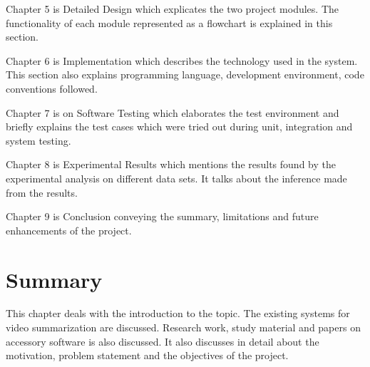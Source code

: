 Chapter 5 is Detailed Design which explicates the two project modules. The functionality of each module represented as a flowchart is explained in this section.

Chapter 6 is Implementation which describes the technology used in the system. This section also explains programming language, development environment, code conventions followed.

Chapter 7 is on Software Testing which elaborates the test environment and briefly explains the test cases which were tried out during unit, integration and system testing.

Chapter 8 is Experimental Results which mentions the results found by the experimental analysis on different data sets. It talks about the inference made from the results.

Chapter 9 is Conclusion conveying the summary, limitations and future enhancements of the project.


\section{Summary}

This chapter deals with the introduction to the topic. The existing systems for video summarization are discussed. Research work, study material and papers on accessory software is also discussed. It also discusses in detail about the motivation, problem statement and the objectives of the project.